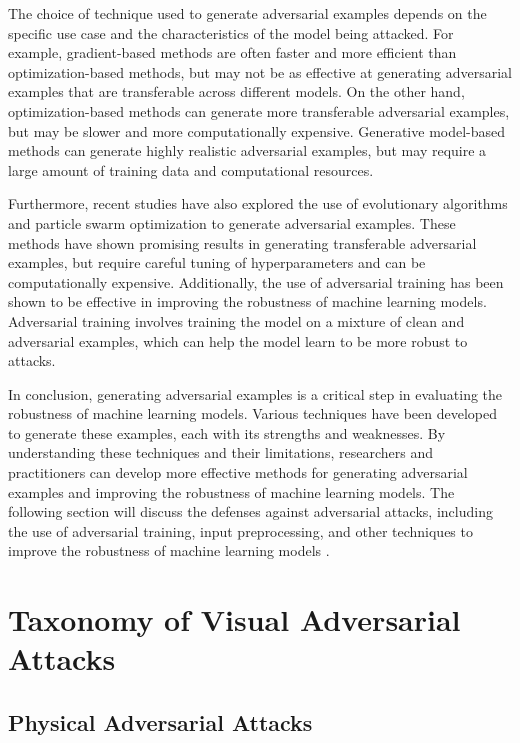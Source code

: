 \documentclass[11pt]{article}
\begin{document}
The choice of technique used to generate adversarial examples depends on the specific use case and the characteristics of the model being attacked. For example, gradient-based methods are often faster and more efficient than optimization-based methods, but may not be as effective at generating adversarial examples that are transferable across different models. On the other hand, optimization-based methods can generate more transferable adversarial examples, but may be slower and more computationally expensive. Generative model-based methods can generate highly realistic adversarial examples, but may require a large amount of training data and computational resources.

Furthermore, recent studies have also explored the use of evolutionary algorithms \cite{ref59} and particle swarm optimization \cite{ref60} to generate adversarial examples. These methods have shown promising results in generating transferable adversarial examples, but require careful tuning of hyperparameters and can be computationally expensive. Additionally, the use of adversarial training \cite{ref61} has been shown to be effective in improving the robustness of machine learning models. Adversarial training involves training the model on a mixture of clean and adversarial examples, which can help the model learn to be more robust to attacks.

In conclusion, generating adversarial examples is a critical step in evaluating the robustness of machine learning models. Various techniques have been developed to generate these examples, each with its strengths and weaknesses. By understanding these techniques and their limitations, researchers and practitioners can develop more effective methods for generating adversarial examples and improving the robustness of machine learning models. The following section will discuss the defenses against adversarial attacks, including the use of adversarial training, input preprocessing, and other techniques to improve the robustness of machine learning models \cite{ref62}.

\section{Taxonomy of Visual Adversarial Attacks}

\subsection{Physical Adversarial Attacks}
\end{document}
